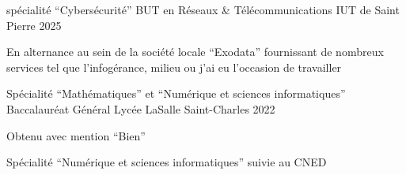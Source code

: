 
\begin{cventries}
  \cventry
    {spécialité ``Cybersécurité''}
    {BUT en Réseaux \& Télécommunications}
    {IUT de Saint Pierre}
    {2025}
    {
      \begin{cvitems}
        \item {En alternance au sein de la société locale ``Exodata'' fournissant de nombreux services tel que l'infogérance, milieu ou j'ai eu l'occasion de travailler}
      \end{cvitems}
    }

  \cventry
    {Spécialité ``Mathématiques'' et ``Numérique et sciences informatiques''}
    {Baccalauréat Général}
    {Lycée LaSalle Saint-Charles}
    {2022}
    {
      \begin{cvitems}
        \item {Obtenu avec mention ``Bien''}
        \item {Spécialité ``Numérique et sciences informatiques'' suivie au CNED}
      \end{cvitems}
    }
\end{cventries}

